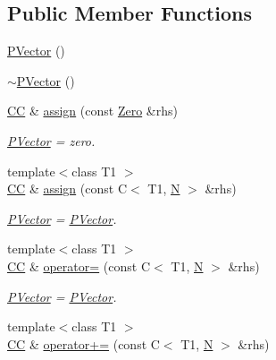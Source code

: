 \subsection*{Public Member Functions}
\begin{DoxyCompactItemize}
\item 
\mbox{\hyperlink{classENSEM_1_1PVector_afc5f971e6ec88789c8205b2e03b1edfd}{P\+Vector}} ()
\item 
\mbox{\hyperlink{classENSEM_1_1PVector_a74ba2f55760e8ed1947ef3bb534400b6}{$\sim$\+P\+Vector}} ()
\item 
\mbox{\hyperlink{classENSEM_1_1PVector_a92dc0a0a301a3dc96f7be5d337019bc7}{CC}} \& \mbox{\hyperlink{classENSEM_1_1PVector_a2dec9eb5015ac1a8a261a20c08d9650c}{assign}} (const \mbox{\hyperlink{structENSEM_1_1Zero}{Zero}} \&rhs)
\begin{DoxyCompactList}\small\item\em \mbox{\hyperlink{classENSEM_1_1PVector}{P\+Vector}} = zero. \end{DoxyCompactList}\item 
{\footnotesize template$<$class T1 $>$ }\\\mbox{\hyperlink{classENSEM_1_1PVector_a92dc0a0a301a3dc96f7be5d337019bc7}{CC}} \& \mbox{\hyperlink{classENSEM_1_1PVector_ab908e56421fdbff29813fb8bdaecdb6f}{assign}} (const C$<$ T1, \mbox{\hyperlink{operator__name__util_8cc_a7722c8ecbb62d99aee7ce68b1752f337}{N}} $>$ \&rhs)
\begin{DoxyCompactList}\small\item\em \mbox{\hyperlink{classENSEM_1_1PVector}{P\+Vector}} = \mbox{\hyperlink{classENSEM_1_1PVector}{P\+Vector}}. \end{DoxyCompactList}\item 
{\footnotesize template$<$class T1 $>$ }\\\mbox{\hyperlink{classENSEM_1_1PVector_a92dc0a0a301a3dc96f7be5d337019bc7}{CC}} \& \mbox{\hyperlink{classENSEM_1_1PVector_a2917b5cc8ed23d68b4cc6f1cfb0f9172}{operator=}} (const C$<$ T1, \mbox{\hyperlink{operator__name__util_8cc_a7722c8ecbb62d99aee7ce68b1752f337}{N}} $>$ \&rhs)
\begin{DoxyCompactList}\small\item\em \mbox{\hyperlink{classENSEM_1_1PVector}{P\+Vector}} = \mbox{\hyperlink{classENSEM_1_1PVector}{P\+Vector}}. \end{DoxyCompactList}\item 
{\footnotesize template$<$class T1 $>$ }\\\mbox{\hyperlink{classENSEM_1_1PVector_a92dc0a0a301a3dc96f7be5d337019bc7}{CC}} \& \mbox{\hyperlink{classENSEM_1_1PVector_a39e015a8751290105c2960d1607c1ce8}{operator+=}} (const C$<$ T1, \mbox{\hyperlink{operator__name__util_8cc_a7722c8ecbb62d99aee7ce68b1752f337}{N}} $>$ \&rhs)

\end{DoxyCompactItemize}
